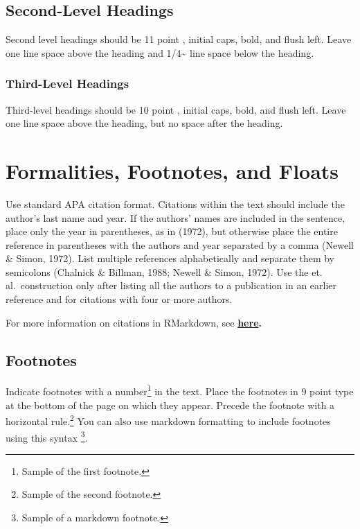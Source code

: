\documentclass[10pt, letterpaper]{article}
\begin{document}
\hypertarget{second-level-headings}{%
\subsection{Second-Level Headings}\label{second-level-headings}}

Second level headings should be 11 point , initial caps, bold, and flush
left. Leave one line space above the heading and 1/4\textasciitilde{}
line space below the heading.

\hypertarget{third-level-headings}{%
\subsubsection{Third-Level Headings}\label{third-level-headings}}

Third-level headings should be 10 point , initial caps, bold, and flush
left. Leave one line space above the heading, but no space after the
heading.

\hypertarget{formalities-footnotes-and-floats}{%
\section{Formalities, Footnotes, and
Floats}\label{formalities-footnotes-and-floats}}

Use standard APA citation format. Citations within the text should
include the author's last name and year. If the authors' names are
included in the sentence, place only the year in parentheses, as in
(1972), but otherwise place the entire reference in parentheses with the
authors and year separated by a comma (Newell \& Simon, 1972). List
multiple references alphabetically and separate them by semicolons
(Chalnick \& Billman, 1988; Newell \& Simon, 1972). Use the et.
al.~construction only after listing all the authors to a publication in
an earlier reference and for citations with four or more authors.

For more information on citations in RMarkdown, see
\textbf{\href{http://rmarkdown.rstudio.com/authoring_bibliographies_and_citations.html\#citations}{here}.}

\hypertarget{footnotes}{%
\subsection{Footnotes}\label{footnotes}}

Indicate footnotes with a number\footnote{Sample of the first
footnote.} in the text. Place the footnotes in 9 point type at the
bottom of the page on which they appear. Precede the footnote with a
horizontal rule.\footnote{Sample of the second footnote.} You can also
use markdown formatting to include footnotes using this syntax
\footnote{Sample of a markdown footnote.}.
\end{document}
